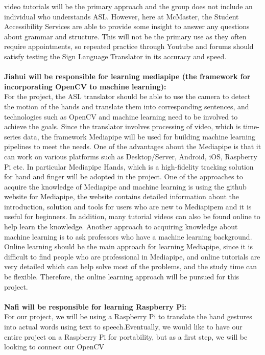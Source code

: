 \documentclass[12pt]{article}
\begin{document}
video tutorials will be the primary approach and the group does not include an individual who understands ASL. However, here at McMaster, 
the Student Accessibility Services are able to provide some insight to answer any questions about grammar and structure. This will not be the 
primary use as they often require appointments, so repeated practice through Youtube and forums should satisfy testing the Sign Language Translator 
in its accuracy and speed.\\
~\\
\textbf{Jiahui will be responsible for learning mediapipe (the framework for incorporating OpenCV to machine learning):}\\
For the project, the ASL translator should be able to use the camera to detect the motion of the hands and translate 
them into corresponding sentences, and technologies such as OpenCV and machine learning need to be involved to achieve 
the goals.  Since the translator involves processing of video, which is time-series data, the framework Mediapipe will be 
used for building machine learning pipelines to meet the needs. One of the advantages about the Mediapipe is that it can work on various platforms such as Desktop/Server, 
Android, iOS, Raspberry Pi etc. In particular Mediapipe Hands, which is a high-fidelity tracking solution for hand and finger will be adopted in the project. One of the 
approaches to acquire the knowledge of Mediapipe and machine learning is using the github website for Mediapipe, the website contains detailed information about the 
introduction, solution and tools for users who are new to Mediapipem and it is useful for beginners. In addition, many tutorial videos can also be found online to help 
learn the knowledge. Another approach to acquiring knowledge about machine learning is to ask professors who have a machine learning background. Online learning should 
be the main approach for learning Mediapipe, since it is difficult to find people who are professional in Mediapipe, and online tutorials are very detailed which can help 
solve most of the problems, and the study time can be flexible. Therefore, the online learning approach will be pursued for this project.\\
~\\
\textbf{Nafi will be responsible for learning Raspberry Pi:}\\
For our project, we will be using a Raspberry Pi to translate the hand gestures into actual words using text to speech.Eventually, we
would like to have our entire project on a Raspberry Pi for portability, but as a first step, we will be looking to connect our OpenCV
\end{document}
